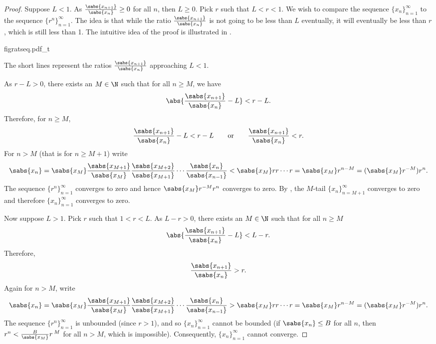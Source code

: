 \begin{proof}
Suppose $L < 1$.
As
$\frac{\sabs{x_{n+1}}}{\sabs{x_n}} \geq 0$ for all $n$, then $L \geq 0$.  Pick
$r$ such that $L < r < 1$.
We wish to compare the sequence $\{ x_n \}_{n=1}^\infty$ to the sequence $\{ r^n \}_{n=1}^\infty$.  The idea is that
while the ratio $\frac{\sabs{x_{n+1}}}{\sabs{x_n}}$ is not going to be less than $L$ eventually,
it will eventually be less than $r$, which is still less than 1.
The intuitive idea of the proof is illustrated in .
\begin{myfigureht}
{figratseq.pdf_t}
\caption{The short lines represent the ratios 
$\frac{\sabs{x_{n+1}}}{\sabs{x_n}}$
approaching $L < 1$.\label{figratseq}}
\end{myfigureht}

As $r-L > 0$, there exists an $M \in \N$ such that for
all $n \geq M$, we have
\begin{equation*}
\abs{\frac{\sabs{x_{n+1}}}{\sabs{x_n}} - L} < r-L .
\end{equation*}
Therefore, for $n \geq M$,
\begin{equation*}
\frac{\sabs{x_{n+1}}}{\sabs{x_n}} - L < r-L 
\qquad \text{or} \qquad
\frac{\sabs{x_{n+1}}}{\sabs{x_n}} < r .
\end{equation*}
For $n > M$ (that is for $n \geq M+1$)
write
\begin{equation*}
\sabs{x_n} =
\sabs{x_M}
\frac{\sabs{x_{M+1}}}{\sabs{x_{M}}}
\frac{\sabs{x_{M+2}}}{\sabs{x_{M+1}}}
\cdots
\frac{\sabs{x_{n}}}{\sabs{x_{n-1}}}
<
\sabs{x_M}
r r \cdots r = \sabs{x_M} r^{n-M} = (\sabs{x_M} r^{-M}) r^n .
\end{equation*}
The sequence $\{ r^n \}_{n=1}^\infty$ converges to zero and hence 
$\sabs{x_M} r^{-M} r^n$ converges to zero.  By ,
the $M$-tail
$\{x_n\}_{n=M+1}^\infty$ converges to zero and therefore $\{x_n\}_{n=1}^\infty$ converges to zero.

Now suppose $L > 1$.  Pick
$r$ such that $1 < r < L$.  As $L-r > 0$,
there exists an $M \in \N$ such that for
all $n \geq M$
\begin{equation*}
\abs{\frac{\sabs{x_{n+1}}}{\sabs{x_n}} - L} < L-r .
\end{equation*}
Therefore,
\begin{equation*}
\frac{\sabs{x_{n+1}}}{\sabs{x_n}} > r .
\end{equation*}
Again for $n > M$,
write
\begin{equation*}
\sabs{x_n} =
\sabs{x_M}
\frac{\sabs{x_{M+1}}}{\sabs{x_{M}}}
\frac{\sabs{x_{M+2}}}{\sabs{x_{M+1}}}
\cdots
\frac{\sabs{x_{n}}}{\sabs{x_{n-1}}}
>
\sabs{x_M}
r r \cdots r = \sabs{x_M} r^{n-M} = (\sabs{x_M} r^{-M}) r^n .
\end{equation*}
The sequence $\{ r^n \}_{n=1}^\infty$ is unbounded (since $r > 1$), and so
$\{x_n\}_{n=1}^\infty$ cannot be bounded (if $\sabs{x_n} \leq B$ for all $n$, then
$r^n < \frac{B}{\sabs{x_M}} r^{\:M}$ for all $n > M$, which is impossible).
Consequently, $\{ x_n \}_{n=1}^\infty$ cannot converge.
\end{proof}

